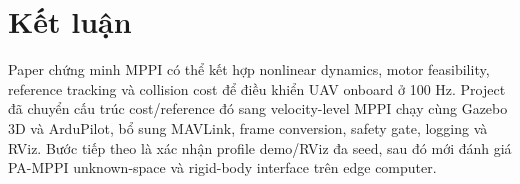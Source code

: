 \documentclass[10pt,a4paper]{article}
\begin{document}
\section{Kết luận}

Paper chứng minh MPPI có thể kết hợp nonlinear dynamics, motor feasibility,
reference tracking và collision cost để điều khiển UAV onboard ở 100 Hz.
Project đã chuyển cấu trúc cost/reference đó sang velocity-level MPPI chạy cùng
Gazebo 3D và ArduPilot, bổ sung MAVLink, frame conversion, safety gate, logging
và RViz. Bước tiếp theo là xác nhận profile demo/RViz đa seed, sau đó mới đánh
giá PA-MPPI unknown-space và rigid-body interface trên edge computer.



\end{document}
